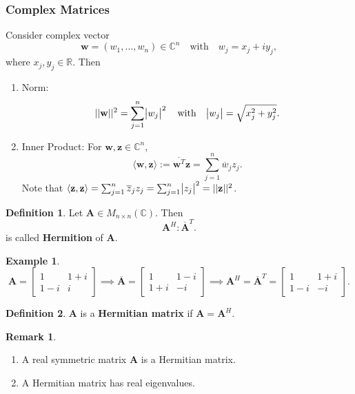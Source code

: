 \documentclass[12pt,openany]{book}
\theoremstyle{definition}
\newtheorem{definition}{Definition}[chapter]
\newtheorem{remark}{Remark}[chapter]
\newtheorem{example}{Example}[chapter]
\newcommand{\R}{\mathbb{R}}
\newcommand{\C}{\mathbb{C}}
\newcommand{\by}{\times}
\newcommand{\inner}[1]{\langle #1\rangle}
\newcommand{\norms}[1]{|| #1||}
\newcommand{\conjugate}[1]{\overline{#1}}
\renewcommand{\vec}[1]{\textbf{#1}}
\begin{document}
	\subsubsection{Complex Matrices}
	Consider complex vector \[
	\vec{w}=(w_1,\dots,w_n)\in\C^n\quad\text{with}\quad w_j=x_j+iy_j,
	\] where \(x_j,y_j\in\R\). Then \begin{enumerate}[(1)]
		\item Norm: \[
		\norms{\vec{w}}^2=\sum_{j=1}^n\abs{w_j}^2\quad\text{with}\quad \abs{w_j}=\sqrt{x_j^2+y_j^2}.
		\]
		\item Inner Product: For \(\vec{w},\vec{z}\in\C^n\), \[		
		\inner{\vec{w},\vec{z}}:=\conjugate{\vec{w}^T}\vec{z}=\sum_{j=1}^n\conjugate{w}_jz_j.
		\] Note that \(\inner{\vec{z},\vec{z}}=\sum_{j=1}^n\conjugate{z}_jz_j=\sum_{j=1}^n\abs{z_j}^2=\norms{\vec{z}}^2\).
	\end{enumerate} 
	\vspace{8pt}
	\begin{tcolorbox}[colframe=defcolor,title={\color{white}\bf Hermition}]
		\begin{definition}
			Let \(\textbf{A}\in M_{n\by n}(\C)\). Then \[
			\textbf{A}^H:\conjugate{\textbf{A}}^T.
			\] is called \textbf{Hermition} of \(\textbf{A}\).
		\end{definition}
	\end{tcolorbox}
	\begin{example}
		\[
		\textbf{A}=\begin{bmatrix}
			1&1+i\\1-i&i
		\end{bmatrix}\implies\conjugate{\textbf{A}}=\begin{bmatrix}
		1&1-i\\1+i&-i
	\end{bmatrix}\implies\textbf{A}^H=\conjugate{\textbf{A}}^T=\begin{bmatrix}
	1&1+i\\1-i&-i
\end{bmatrix}.
		\]
	\end{example}
	\vspace{4pt}
	\begin{tcolorbox}[colframe=defcolor,title={\color{white}\bf Hermitian Matrix}]
		\begin{definition}
			\(\textbf{A}\) is a \textbf{Hermitian matrix} if \(\textbf{A}=\textbf{A}^H\).
		\end{definition}
	\end{tcolorbox}
	\begin{remark}
		\ \begin{enumerate}[(1)]
			\item A real symmetric matrix \(\textbf{A}\) is a Hermitian matrix.
			\item A Hermitian matrix has real eigenvalues.
		\end{enumerate}
	\end{remark}
\end{document}
